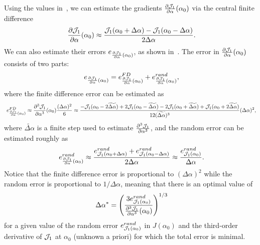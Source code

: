 \documentclass[times,final,nopreprintline]{elsarticle}
\begin{document}
Using the values in~, we can estimate the gradients $\frac{\partial \mathcal J_1}{\partial \alpha}(\alpha_0)$ via the central finite difference 
\begin{equation}~\label{eq:FD_gradient}
\frac{\partial \mathcal J_1}{\partial \alpha}(\alpha_0) \approx \frac{\mathcal J_1(\alpha_0+\Delta \alpha)-\mathcal J_1(\alpha_0-\Delta \alpha)}{2 \Delta \alpha}.
\end{equation}
We can also estimate their errors $e_{\frac{\partial \mathcal J_1}{\partial \alpha}(\alpha_0)}$, as shown in~. The error in $\frac{\partial \mathcal J_1}{\partial \alpha}(\alpha_0)$ consists of two parts:
\begin{equation}~\label{eq:total_error}
e_{\frac{\partial \mathcal J_1}{\partial \alpha}(\alpha_0)} = e^{FD}_{\frac{\partial \mathcal J_1}{\partial \alpha}(\alpha_0)} + e^{rand}_{\frac{\partial \mathcal J_1}{\partial \alpha}(\alpha_0)},
\end{equation}
where the finite difference error can be estimated as 
\begin{equation}~\label{eq:FD_error}
e^{FD}_{\frac{\partial \mathcal J_1}{\partial \alpha}(\alpha_0) } \approx \frac{\partial^3\mathcal J_1}{\partial \alpha^3}(\alpha_0) \frac{(\Delta \alpha)^2}{6} \approx 
\frac{-\mathcal J_1(\alpha_0-2\widetilde{\Delta \alpha})+2\mathcal J_1(\alpha_0-\widetilde{\Delta \alpha})-2\mathcal J_1(\alpha_0+\widetilde{\Delta \alpha})+\mathcal J_1(\alpha_0+2\widetilde{\Delta \alpha})}{12 (\widetilde{\Delta \alpha})^3} (\Delta \alpha)^2,
\end{equation}
where $\widetilde{\Delta \alpha}$ is a finite step used to estimate $\frac{\partial^3\mathcal J_1}{\partial \alpha^3}$, and the random error can be estimated roughly as
\begin{equation}~\label{eq:rand_error}
e^{rand}_{\frac{\partial \mathcal J_1}{\partial \alpha}(\alpha_0) } \approx \frac{e^{rand}_{\mathcal J_1(\alpha_0+\Delta \alpha)}  + e^{rand}_{\mathcal J_1(\alpha_0-\Delta \alpha)}}{2 \Delta \alpha} \approx \frac{e^{rand}_{\mathcal J_1(\alpha_0)}}{\Delta \alpha}.
\end{equation}
Notice that the finite difference error is proportional to $(\Delta \alpha)^2$ while the random error is proportional to $1/\Delta \alpha$, meaning that there is an optimal value of 
\begin{equation}~\label{eq:opt_alpha}
\Delta \alpha^* = \left( \frac{3 e^{rand}_{\mathcal J_1(\alpha_0)} }{ \frac{\partial^3\mathcal J_1}{\partial \alpha^3}(\alpha_0)} \right)^{1/3} 
\end{equation}
for a given value of the random error $e^{rand}_{\mathcal J_1(\alpha_0)}$ in $J(\alpha_0)$ and the third-order derivative of $\mathcal J_1$ at $\alpha_0$ (unknown a priori) for which the total error is minimal. 
\end{document}
